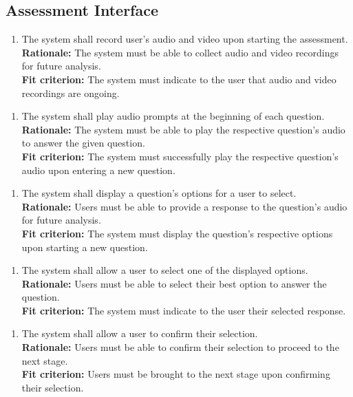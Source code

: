 \documentclass[12pt]{article}
\begin{document}
\subsection{Assessment Interface}
\begin{enumerate}[{FR-AI}1. ]
  \item The system shall record user's audio and video upon starting the assessment.\\
  \textbf{Rationale: }The system must be able to collect audio and video recordings for future analysis.\\
  \textbf{Fit criterion: }The system must indicate to the user that audio and video recordings are ongoing.  
\end{enumerate}
\begin{enumerate}[{FR-AI}2. ]
  \item The system shall play audio prompts at the beginning of each question.\\
  \textbf{Rationale: }The system must be able to play the respective question's audio to answer the given question.\\
  \textbf{Fit criterion: }The system must successfully play the respective question's audio upon entering a new question.
\end{enumerate}
\begin{enumerate}[{FR-AI}3. ]
  \item The system shall display a question's options for a user to select.\\
  \textbf{Rationale: }Users must be able to provide a response to the question's audio for future analysis.\\
  \textbf{Fit criterion: }The system must display the question's respective options upon starting a new question.
\end{enumerate}
\begin{enumerate}[{FR-AI}4. ]
  \item The system shall allow a user to select one of the displayed options.\\
  \textbf{Rationale: }Users must be able to select their best option to answer the question.\\
  \textbf{Fit criterion: }The system must indicate to the user their selected response.
\end{enumerate}
\begin{enumerate}[{FR-AI}5. ]
  \item The system shall allow a user to confirm their selection.\\
  \textbf{Rationale: }Users must be able to confirm their selection to proceed to the next stage.\\
  \textbf{Fit criterion: }Users must be brought to the next stage upon confirming their selection.
\end{enumerate}
\end{document}
